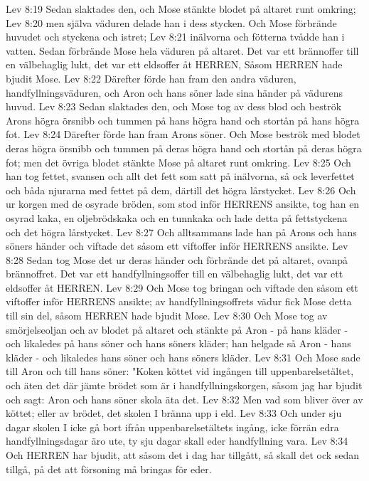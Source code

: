 Lev 8:19  Sedan slaktades den, och Mose stänkte blodet på altaret runt omkring;
Lev 8:20  men själva väduren delade han i dess stycken. Och Mose förbrände huvudet och styckena och istret;
Lev 8:21  inälvorna och fötterna tvådde han i vatten. Sedan förbrände Mose hela väduren på altaret. Det var ett brännoffer till en välbehaglig lukt, det var ett eldsoffer åt HERREN, Såsom HERREN hade bjudit Mose.
Lev 8:22  Därefter förde han fram den andra väduren, handfyllningsväduren, och Aron och hans söner lade sina händer på vädurens huvud.
Lev 8:23  Sedan slaktades den, och Mose tog av dess blod och beströk Arons högra örsnibb och tummen på hans högra hand och stortån på hans högra fot.
Lev 8:24  Därefter förde han fram Arons söner. Och Mose beströk med blodet deras högra örsnibb och tummen på deras högra hand och stortån på deras högra fot; men det övriga blodet stänkte Mose på altaret runt omkring.
Lev 8:25  Och han tog fettet, svansen och allt det fett som satt på inälvorna, så ock leverfettet och båda njurarna med fettet på dem, därtill det högra lårstycket.
Lev 8:26  Och ur korgen med de osyrade bröden, som stod inför HERRENS ansikte, tog han en osyrad kaka, en oljebrödskaka och en tunnkaka och lade detta på fettstyckena och det högra lårstycket.
Lev 8:27  Och alltsammans lade han på Arons och hans söners händer och viftade det såsom ett viftoffer inför HERRENS ansikte.
Lev 8:28  Sedan tog Mose det ur deras händer och förbrände det på altaret, ovanpå brännoffret. Det var ett handfyllningsoffer till en välbehaglig lukt, det var ett eldsoffer åt HERREN.
Lev 8:29  Och Mose tog bringan och viftade den såsom ett viftoffer inför HERRENS ansikte; av handfyllningsoffrets vädur fick Mose detta till sin del, såsom HERREN hade bjudit Mose.
Lev 8:30  Och Mose tog av smörjelseoljan och av blodet på altaret och stänkte på Aron - på hans kläder - och likaledes på hans söner och hans söners kläder; han helgade så Aron - hans kläder - och likaledes hans söner och hans söners kläder.
Lev 8:31  Och Mose sade till Aron och till hans söner: "Koken köttet vid ingången till uppenbarelsetältet, och äten det där jämte brödet som är i handfyllningskorgen, såsom jag har bjudit och sagt: Aron och hans söner skola äta det.
Lev 8:32  Men vad som bliver över av köttet; eller av brödet, det skolen I bränna upp i eld.
Lev 8:33  Och under sju dagar skolen I icke gå bort ifrån uppenbarelsetältets ingång, icke förrän edra handfyllningsdagar äro ute, ty sju dagar skall eder handfyllning vara.
Lev 8:34  Och HERREN har bjudit, att såsom det i dag har tillgått, så skall det ock sedan tillgå, på det att försoning må bringas för eder.
